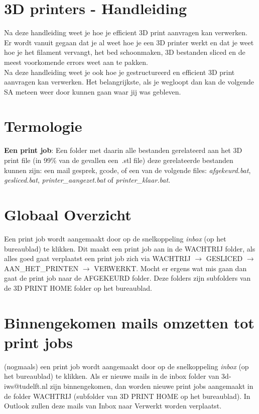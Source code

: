 \documentclass{article}
\begin{document}
\pagestyle{empty}
\large
\section*{\centering\hspace{-1cm}3D printers - Handleiding}
Na deze handleiding weet je hoe je efficient 3D print aanvragen kan verwerken. Er wordt vanuit gegaan dat je al weet hoe je een 3D printer werkt en dat je weet hoe je het filament vervangt, het bed schoonmaken, 3D bestanden sliced en de meest voorkomende errors weet aan te pakken.\\

Na deze handleiding weet je ook hoe je gestructureerd en efficient 3D print aanvragen kan verwerken. Het belangrijkste, als je wegloopt dan kan de volgende SA meteen weer door kunnen gaan waar jij was gebleven.

\section*{Termologie}
\noindent\textbf{Een print job}: Een folder met daarin alle bestanden gerelateerd aan het 3D print file (in 99\% van de gevallen een~.stl file) deze gerelateerde bestanden kunnen zijn: een mail gesprek, gcode, of een van de volgende files: \textit{afgekeurd.bat}, \textit{gesliced.bat}, \textit{printer\_aangezet.bat} of \textit{printer\_klaar.bat}.

\section*{Globaal Overzicht}

Een print job wordt aangemaakt door op de snelkoppeling \textit{inbox} (op het bureaublad) te klikken. Dit maakt een print job aan in de WACHTRIJ folder, als alles goed gaat verplaatst een print job zich via WACHTRIJ $\rightarrow$ GESLICED $\rightarrow$ AAN\_HET\_PRINTEN $\rightarrow$ VERWERKT. Mocht er ergens wat mis gaan dan gaat de print job naar de AFGEKEURD folder. Deze folders zijn subfolders van de 3D PRINT HOME folder op het bureaublad.

\begin{center}
\scalebox{0.7}{
  
}
\end{center}
\section*{Binnengekomen mails omzetten tot print jobs}
(nogmaals) een print job wordt aangemaakt door op de snelkoppeling \textit{inbox} (op het bureaublad) te klikken. Als er nieuwe mails in de inbox folder van 3d-iws@tudelft.nl zijn binnengekomen, dan worden nieuwe print jobs aangemaakt in de folder WACHTRIJ (subfolder van 3D PRINT HOME op het bureaublad). In Outlook zullen deze mails van Inbox naar Verwerkt worden verplaatst.\\
\end{document}
